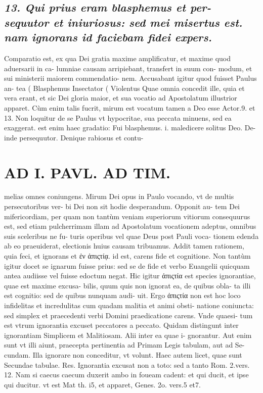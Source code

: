 \documentclass{article}
\begin{document}
\begin{pages}
\subsection*{\textit{13. Qui prius eram blasphemus et per- sequutor et iniuriosus: sed mei misertus est. nam ignorans id faciebam fidei expers. }}\pstart Comparatio est, ex qua Dei gratia maxime amplificatur, et maxime quod aduersarii in ca- lumniae causam arripiebant, transfert in suum con- modum, et sui ministerii maiorem commendatio- nem. Accusabant igitur quod fuisset Paulus an- tea ( Blasphemus Insectator ( Violentus Quae omnia concedit ille, quia et vera erant, et sic Dei gloria maior, et sua vocatio ad Apostolatum illustrior apparet. Cùm enim talis fucrit, mirum est vocatum tamen a Deo esse Actor.9. et 13. Non loquitur de se Paulus vt hypocritae, sua peccata minuens, sed ea exaggerat. est enim haec gradatio: Fui blasphemus. i. maledicere solitus Deo. De- inde persequutor. Denique rabiosus et contu-  \pend
\section*{AD I. PAVL. AD TIM. }
\marginpar{[ p.26 ]}\pstart melias omnes coniungens. Mirum Dei opus in Paulo vocando, vt de multis persecutoribus ver- bi Dei non sit hodie desperandum. Opponit au- tem Dei mifericordiam, per quam non tantùm veniam superiorum vitiorum consequurus est, sed etiam pulcherrimam illam ad Apostolatum vocationem adeptus, omnibus suis sceleribus ne fu- turis operibus vel quae Deus post Pauli voca- tionem edenda ab eo praeuiderat, electionis huius causam tribuamus.  \pend\pstart Addit tamen rationem, quia feci, et ignorans et ἐν ἀπιςτίᾳ. id est, carens fide et cognitione. Non tantùm igitur docet se ignarum fuisse prius: sed se de fide et verbo Euangelii quicquam antea audiisse vel fuisse edoctum negat. Hic igitur ἀπιςτία est species ignorantiae, quae est maxime excusa- bilis, quum quis non ignorat ea, de quibus obla- ta illi est cognitio: sed de quibus nunquam audi- uit. Ergo ἀπιςτία non est hoc loco infidelitas et incredulitas cum quadam malitia et animi obsti- natione coniuncta: sed simplex et praecedenti verbi Domini praedicatione carens. Vnde quaesi- tum est vtrum ignorantia excuset peccatores a peccato. Quidam distingunt inter ignorantiam Simplicem et Malitiosam. Alii inter ea quae i- gnorantur. Aut enim sunt vt illi aiunt, praecepta pertinentia ad Primam Legis tabulam, aut ad Se- cundam. Illa ignorare non conceditur, vt volunt. Haec autem licet, quae sunt Secundae tabulae. Res. Ignorantia excusat non a toto: sed a tanto Rom. 2.vers. 12. Nam si caecus caecum duxerit ambo in foueam cadent: et qui ducit, et ipse qui ducitur. vt est Mat th. i5, et apparet, Genes. 2o. vers.5 et7.  \pend

\end{pages}
\end{document}
